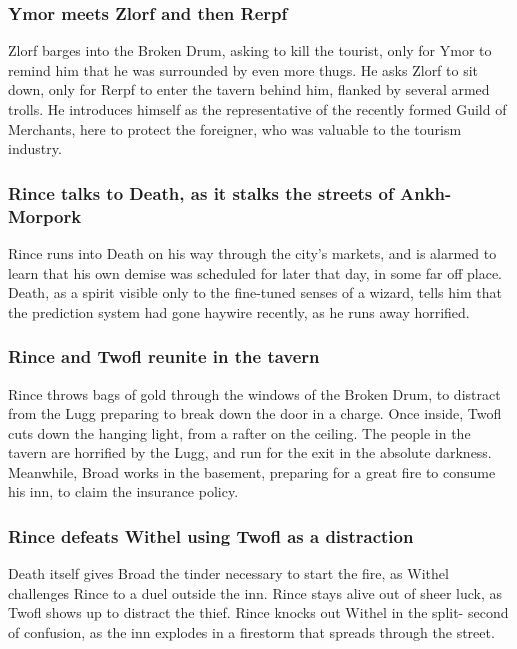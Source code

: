 \subsubsection{\Gls{Ymor} meets \Gls{Zlorf} and then \Gls{Rerpf}}
\Gls{Zlorf} barges into the Broken Drum, asking to kill the tourist, only for \Gls{Ymor} to remind
him that he was surrounded by even more thugs. He asks \Gls{Zlorf} to sit down, only for \Gls{Rerpf}
to enter the tavern behind him, flanked by several armed trolls. He introduces himself as the
representative of the recently formed Guild of Merchants, here to protect the foreigner, who was
valuable to the tourism industry.

\subsubsection{\Gls{Rince} talks to \Gls{Death}, as it stalks the streets of Ankh-Morpork}
\Gls{Rince} runs into \Gls{Death} on his way through the city's markets, and is alarmed to learn
that his own demise was scheduled for later that day, in some far off place. \Gls{Death}, as a
spirit visible only to the fine-tuned senses of a wizard, tells him that the prediction system had
gone haywire recently, as he runs away horrified.

\subsubsection{\Gls{Rince} and \Gls{Twofl} reunite in the tavern}
\Gls{Rince} throws bags of gold through the windows of the Broken Drum, to distract from the
\Gls{Lugg} preparing to break down the door in a charge. Once inside, \Gls{Twofl} cuts down the
hanging light, from a rafter on the ceiling. The people in the tavern are horrified by the
\Gls{Lugg}, and run for the exit in the absolute darkness. Meanwhile, \Gls{Broad} works in the
basement, preparing for a great fire to consume his inn, to claim the insurance policy.

\subsubsection{\Gls{Rince} defeats \Gls{Withel} using \Gls{Twofl} as a distraction}
\Gls{Death} itself gives \Gls{Broad} the tinder necessary to start the fire, as \Gls{Withel}
challenges \Gls{Rince} to a duel outside the inn. \Gls{Rince} stays alive out of sheer luck, as
\Gls{Twofl} shows up to distract the thief. \Gls{Rince} knocks out \Gls{Withel} in the split-
second of confusion, as the inn explodes in a firestorm that spreads through the street.

